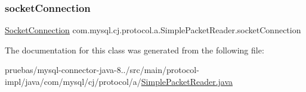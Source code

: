 \subsubsection{\texorpdfstring{socket\+Connection}{socketConnection}}
{\footnotesize\ttfamily \mbox{\hyperlink{interfacecom_1_1mysql_1_1cj_1_1protocol_1_1_socket_connection}{Socket\+Connection}} com.\+mysql.\+cj.\+protocol.\+a.\+Simple\+Packet\+Reader.\+socket\+Connection\hspace{0.3cm}{\ttfamily [protected]}}



The documentation for this class was generated from the following file\+:\begin{DoxyCompactItemize}
\item 
pruebas/mysql-\/connector-\/java-\/8../src/main/protocol-\/impl/java/com/mysql/cj/protocol/a/\mbox{\hyperlink{_simple_packet_reader_8java}{Simple\+Packet\+Reader.\+java}}\end{DoxyCompactItemize}
